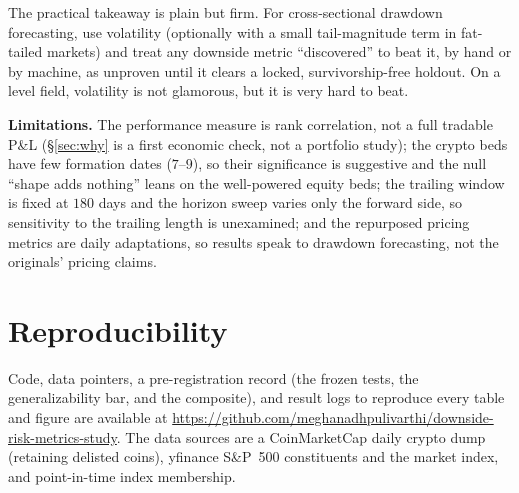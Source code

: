 \documentclass[sigconf,nonacm]{acmart}
\begin{document}
The practical takeaway is plain but firm. For cross-sectional drawdown
forecasting, use volatility (optionally with a small tail-magnitude term in
fat-tailed markets) and treat any downside metric ``discovered'' to beat it,
by hand or by machine, as unproven until it clears a locked, survivorship-free
holdout. On a level field, volatility is not glamorous, but it is very hard to beat.

\textbf{Limitations.} The performance measure is rank correlation, not a full tradable P\&L
(\S\ref{sec:why} is a first economic check, not a portfolio study); the
crypto beds have few formation dates ($7$--$9$), so their significance is
suggestive and the null ``shape adds nothing'' leans on the well-powered equity
beds; the trailing window is fixed at $180$ days and the horizon sweep varies only the
forward side, so sensitivity to the trailing length is unexamined; and the repurposed
pricing metrics are daily adaptations, so results speak to
drawdown forecasting, not the originals' pricing claims.




\appendix
\section{Reproducibility}\label{app:repro}
Code, data pointers, a pre-registration record (the frozen tests, the generalizability
bar, and the composite), and result logs to reproduce every table and figure are
available at \url{https://github.com/meghanadhpulivarthi/downside-risk-metrics-study}.
The data sources are a CoinMarketCap daily
crypto dump (retaining delisted coins), yfinance S\&P~500 constituents and the
market index, and point-in-time index membership.
\end{document}
